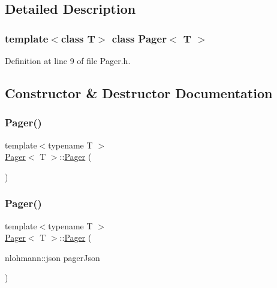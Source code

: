 \subsection{Detailed Description}
\subsubsection*{template$<$class T$>$\newline
class Pager$<$ T $>$}



Definition at line 9 of file Pager.\+h.



\subsection{Constructor \& Destructor Documentation}
\mbox{\label{class_pager_a757290933bf0ac30c6a97a93b4b756ee}} 
\subsubsection{\texorpdfstring{Pager()}{Pager()}\hspace{0.1cm}{\footnotesize\ttfamily [1/2]}}
{\footnotesize\ttfamily template$<$typename T $>$ \\
\mbox{\hyperlink{class_pager}{Pager}}$<$ T $>$\+::\mbox{\hyperlink{class_pager}{Pager}} (\begin{DoxyParamCaption}{ }\end{DoxyParamCaption})\hspace{0.3cm}{\ttfamily [default]}}

\mbox{\label{class_pager_ab2467f63b7aa9170476a56d0c8722f6e}} 
\subsubsection{\texorpdfstring{Pager()}{Pager()}\hspace{0.1cm}{\footnotesize\ttfamily [2/2]}}
{\footnotesize\ttfamily template$<$typename T $>$ \\
\mbox{\hyperlink{class_pager}{Pager}}$<$ T $>$\+::\mbox{\hyperlink{class_pager}{Pager}} (\begin{DoxyParamCaption}\item[{nlohmann\+::json}]{pager\+Json }\end{DoxyParamCaption})}



